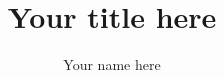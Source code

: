 \documentclass[12pt]{article}
\title{Your title here}
\author{Your name here}
\begin{document}
\maketitle
\frontmatter


\makefrontmatter


\mainmatter




\backmatter
\makereferences
\appendix

\end{document}
